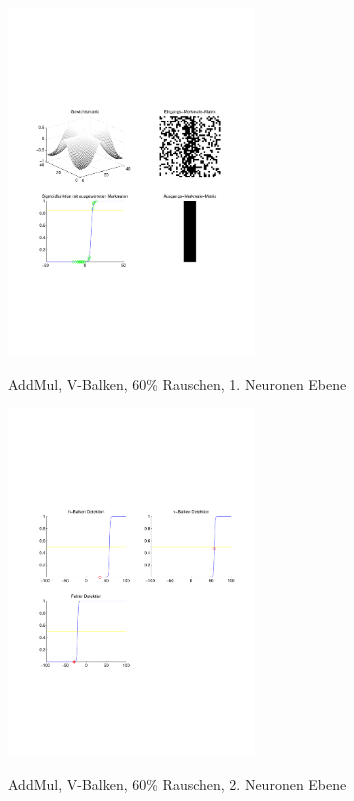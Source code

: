 \begin{figure}[hbt]
	\begin{minipage}[c]{\textwidth}
		\centering
       	\includegraphics[trim=71 213 43 212, clip, width=0.58\textwidth]{./Bilder/Auswertung/Endergebnis/TypeAddMul_Rauschen60_V_Line_Layer1}
		\caption{AddMul, V-Balken, 60\% Rauschen, 1. Neuronen Ebene}
		\label{AddMul_V_60_1}
		\vfill
		\includegraphics[trim=71 213 43 212, clip, width=0.58\textwidth]{./Bilder/Auswertung/Endergebnis/TypeAddMul_Rauschen60_V_Line_Layer2}
		\caption{AddMul, V-Balken, 60\% Rauschen, 2. Neuronen Ebene}
		\label{AddMul_V_60_2}
	\end{minipage}
\end{figure}

